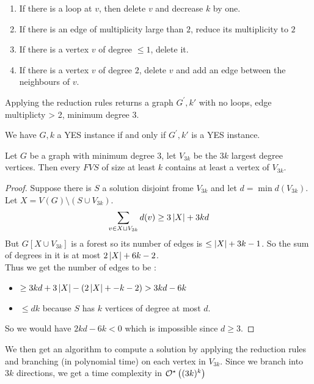\documentclass[12pt]{cours}
\begin{document}
\begin{proposition}
    \begin{enumerate}
        \item If there is a loop at $v$, then delete $v$ and decrease $k$ by one.
        \item If there is an edge of multiplicity large than $2$, reduce its multiplicity to $2$
        \item If there is a vertex $v$ of degree $\leq 1$, delete it.
        \item If there is a vertex $v$ of degree $2$, delete $v$ and add an edge between the neighbours of $v$.
    \end{enumerate}
    Applying the reduction rules returns a graph $G^{'}, k'$ with no loops, edge multiplicty > 2, minimum degree $3$.

    We have $G, k$ a YES instance if and only if $G^{'}, k'$ is a YES instance.
\end{proposition}

\begin{lemma}
    Let $G$ be a graph with minimum degree $3$, let $V_{3k}$ be the $3k$ largest degree vertices. Then every $FVS$ of size at least $k$ contains at least a vertex of $V_{3k}$.
\end{lemma}
\begin{proof}
    Suppose there is $S$ a solution disjoint frome $V_{3k}$ and let $d = \min d(V_{3k})$. Let $X = V(G) \setminus \left(S \cup V_{3k}\right)$.
    \[
        \sum_{v \in X \sqcup V_{3k}} d(v) \geq 3 \left|X\right| + 3kd
    \]
    But $G[X \cup V_{3k}]$ is a forest so its number of edges is $\leq \left|X\right| + 3k - 1$. So the sum of degrees in it is at most $2\left|X\right| + 6k - 2$. \\
    Thus we get the number of edges to be :
    \begin{itemize}
        \item $\geq 3kd + 3\left|X\right| - \left(2 \left|X\right| + -k - 2\right) > 3kd - 6k$
        \item $\leq dk$ because $S$ has $k$ vertices of degree at most $d$.
    \end{itemize}
    So we would have $2kd - 6k < 0$ which is impossible since $d \geq 3$.
\end{proof}

We then get an algorithm to compute a solution by applying the reduction rules and branching (in polynomial time) on each vertex in $V_{3k}$. Since we branch into $3k$ directions, we get a time complexity in $\mathcal{O}^{\star}\left((3k)^{k}\right)$
\end{document}
